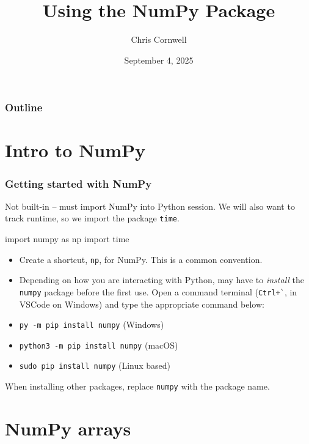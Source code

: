 \documentclass{beamer}
\author{Chris Cornwell}
\date{September 4, 2025}
\title{Using the NumPy Package}
\newenvironment{codeblock}
    {\hfill\begin{beamerboxesrounded}[lower=codecol, width=0.8\textwidth]
    \medskip

    }
    { 
    \end{beamerboxesrounded}\hfill
    }
\theoremstyle{example}
\newcommand{\ct}[1]{\lstinline[language=Python,basicstyle=\ttfamily\footnotesize,stringstyle=\small\color{strings}]!#1!}
\begin{document}
\begin{frame}
\titlepage
\end{frame}

\begin{frame}
\frametitle{Outline}
\tableofcontents
\end{frame}

\section{Intro to NumPy}

\begin{frame}[fragile]
\frametitle{Getting started with NumPy}
Not built-in {--} must import NumPy into Python session. We will also want to track runtime, so we import the package \ct{time}.

\pause 
\begin{codeblock}

\begin{python}
    import numpy as np
    import time
\end{python}

\end{codeblock}

\begin{itemize}
    \item[] Create a shortcut, \ct{np}, for NumPy. This is a common convention.
\end{itemize}

\pause
\begin{itemize}
	\item Depending on how you are interacting with Python, may have to \emph{install} the \ct{numpy} package before the first use. Open a command terminal (\ct{Ctrl+`}, in VSCode on Windows) and type the appropriate command below:
\end{itemize}
\vspace*{-8pt}
\begin{itemize}
	\item[] \ct{py -m pip install numpy} (Windows)
	\item[] \ct{python}{\footnotesize\texttt{3}}\ct{ -m pip install numpy} (macOS)
    \item[] \ct{sudo pip install numpy} (Linux based)
\end{itemize}
\pause
When installing other packages, replace \ct{numpy} with the package name.

\end{frame}

\section{NumPy arrays}
\end{document}
